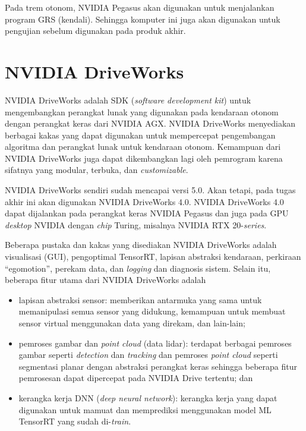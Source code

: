 Pada trem otonom, NVIDIA Pegasus akan digunakan untuk menjalankan program GRS
(kendali). Sehingga komputer ini juga akan digunakan untuk pengujian sebelum
digunakan pada produk akhir.

\section{NVIDIA DriveWorks}

NVIDIA DriveWorks adalah SDK (\textit{software development kit}) untuk
mengembang\-kan perangkat lunak yang digunakan pada kendaraan otonom dengan
perangkat keras dari NVIDIA AGX. NVIDIA DriveWorks menyediakan berbagai kakas yang
dapat  digunakan untuk mempercepat pengembangan algoritma dan perangkat lunak
untuk kendaraan otonom. Kemampuan dari NVIDIA DriveWorks juga dapat dikembangkan
lagi oleh pemrogram karena sifatnya yang modular, terbuka, dan
\textit{customizable}.

NVIDIA DriveWorks sendiri sudah mencapai versi 5.0. Akan tetapi, pada tugas
akhir ini akan digunakan NVIDIA DriveWorks 4.0. NVIDIA DriveWorks 4.0 dapat
dijalankan pada perangkat keras  NVIDIA Pegasus dan juga pada GPU
\textit{desktop} NVIDIA dengan \textit{chip} Turing, misalnya NVIDIA RTX
20-\textit{series}.

Beberapa pustaka dan kakas yang disediakan NVIDIA DriveWorks adalah visualisasi
(GUI), pengoptimal TensorRT, lapisan abstraksi kendaraan, perkiraan
``egomotion'', perekam data, dan \textit{logging} dan diagnosis sistem. Selain
itu, beberapa fitur utama dari NVIDIA DriveWorks adalah
\begin{itemize}
    \item lapisan abstraksi sensor: memberikan antarmuka yang sama untuk
        memanipulasi semua sensor yang didukung, kemampuan untuk membuat sensor
        virtual menggunakan data yang direkam, dan lain-lain;
    \item pemroses gambar dan \textit{point cloud} (data lidar): terdapat
        berbagai pemroses gambar seperti \textit{detection} dan
        \textit{tracking} dan pemroses \textit{point cloud} seperti segmentasi
        planar dengan abstraksi perangkat keras sehingga beberapa fitur
        pemrosesan dapat dipercepat pada NVIDIA Drive tertentu; dan
    \item kerangka kerja DNN (\textit{deep neural network}): kerangka kerja yang
        dapat digunakan untuk mamuat dan memprediksi menggunakan model ML
        TensorRT yang sudah di-\textit{train}.
\end{itemize}


